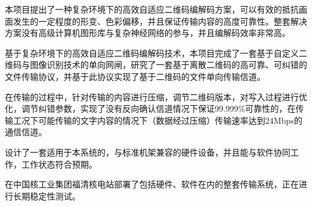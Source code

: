 \begin{conclusion}

本项目提出了一种复杂环境下的高效自适应二维码编解码方案，可以有效的抵抗画面发生的一定程度的形变、色彩偏移，并且保证传输内容的高度可靠性。整套解决方案没有高级计算机图形库与复杂神经网络的参与，并且编解码效率非常高。

基于复杂环境下的高效自适应二维码编解码技术，本项目完成了一套基于自定义二维码与图像识别技术的单向网闸，研究了一套基于离散二维码的高可靠、可纠错的文件传输协议，并基于此协议实现了基于二维码的文件单向传输信道。

在传输的过程中，针对传输的内容进行压缩，调节二维码版本，对写入过程进行优化，调节纠错参数，实现了没有反向确认信道情况下保证99.999\%可靠性的，在传输工况下可能传输的文字内容的情况下（数据经过压缩）传输速率达到24Mbps的通信信道。

设计了一套适用于本系统的，与标准机架兼容的硬件设备，并且能与软件协同工作，工作状态符合预期。

在中国核工业集团福清核电站部署了包括硬件、软件在内的整套传输系统，正在进行长期稳定性测试。

\end{conclusion}